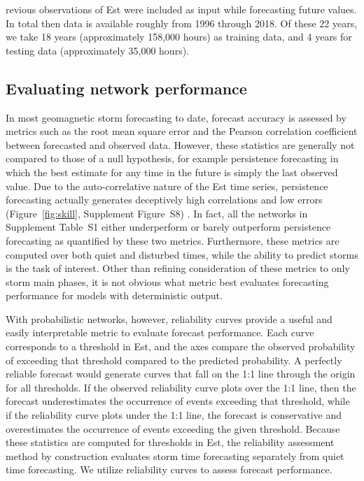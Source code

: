 \documentclass[draft,linenumbers]{agujournal2018}
\begin{document}
revious observations of Est were included as input while forecasting future values. In total then data is available roughly from 1996 through 2018. Of these 22 years, we take 18 years (approximately 158,000 hours) as training data, and 4 years for testing data (approximately 35,000 hours).


\subsection{Evaluating network performance}
In most geomagnetic storm forecasting to date, forecast accuracy is assessed by metrics such as the root mean square error and the Pearson correlation coefficient between forecasted and observed data. However, these statistics are generally not compared to those of a null hypothesis, for example persistence forecasting in which the best estimate for any time in the future is simply the last observed value. Due to the auto-correlative nature of the Est time series, persistence forecasting actually generates deceptively high correlations and low errors (Figure~\ref{fig:skill}, Supplement Figure~S8) \citep{Shprits2019}. In fact, all the networks in Supplement Table~S1 either underperform or barely outperform persistence forecasting as quantified by these two metrics. Furthermore, these metrics are computed over both quiet and disturbed times, while the ability to predict storms is the task of interest. Other than refining consideration of these metrics to only storm main phases, it is not obvious what metric best evaluates forecasting performance for models with deterministic output. 

With probabilistic networks, however, reliability curves provide a useful and easily interpretable metric to evaluate forecast performance. Each curve corresponds to a threshold in Est, and the axes compare the observed probability of exceeding that threshold compared to the predicted probability. A perfectly reliable forecast would generate curves that fall on the 1:1 line through the origin for all thresholds. If the observed reliability curve plots over the 1:1 line, then the forecast underestimates the occurrence of events exceeding that threshold, while if the reliability curve plots under the 1:1 line, the forecast is conservative and overestimates the occurrence of events exceeding the given threshold. Because these statistics are computed for thresholds in Est, the reliability assessment method by construction evaluates storm time forecasting separately from quiet time forecasting. We utilize reliability curves to assess forecast performance. 
\end{document}
